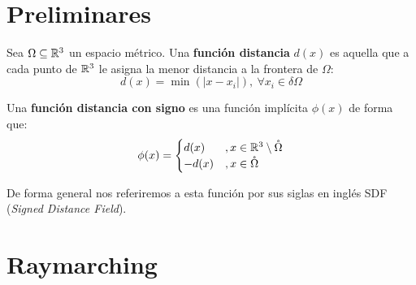 
\section{Preliminares}

\begin{definicion}
    Sea $\Omega \subseteq \mathbb{R}^3$ un espacio métrico. Una \textbf{función distancia} $d(x)$ es aquella que a cada punto de $\mathbb{R}^3$ le asigna la menor distancia a la frontera de $\Omega$:
    \begin{equation*}
        d(x) = \min(|x-x_i|),\ \forall x_i \in \delta\Omega
    \end{equation*}
\end{definicion}

\begin{definicion}[SDF]
    Una \textbf{función distancia con signo} es una función implícita $\phi(x)$ de forma que:
    \begin{equation*}
        \phi(x) = \begin{cases}
            d(x)  & , x\in \mathbb{R}^3\setminus \mathring{\Omega} \\
            -d(x) & , x\in \mathring{\Omega}
        \end{cases}
    \end{equation*}

    De forma general nos referiremos a esta función por sus siglas en inglés SDF (\textit{Signed Distance Field}).
\end{definicion}

\section{Raymarching}

